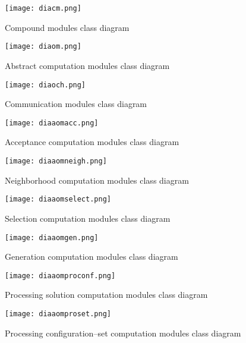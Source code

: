 \begin{figure}
	\centering
	\texttt{[image: diacm.png]}
	\caption[]{Compound modules class diagram}\label{diag:cm}
\end{figure}

\begin{figure}
	\centering
	\texttt{[image: diaom.png]}
	\caption[]{Abstract computation modules class diagram}\label{diag:om}
\end{figure}

\begin{figure}
	\centering
	\texttt{[image: diaoch.png]}
	\caption[]{Communication modules class diagram}\label{diag:opch}
\end{figure}

\begin{figure}
	\centering
	\texttt{[image: diaaomacc.png]}
	\caption[]{Acceptance computation modules class diagram}\label{diag:accmodules}
\end{figure}

\begin{figure}
	\centering
	\texttt{[image: diaaomneigh.png]}
	\caption[]{Neighborhood computation modules class diagram}\label{diag:neighmodules}
\end{figure}

\begin{figure}
	\centering
	\texttt{[image: diaaomselect.png]}
	\caption[]{Selection computation modules class diagram}\label{diag:selectmodules}
\end{figure}

\begin{figure}
	\centering
	\texttt{[image: diaaomgen.png]}
	\caption[]{Generation computation modules class diagram}\label{diag:genmodules}
\end{figure}

\begin{figure}
	\centering
	\texttt{[image: diaaomproconf.png]}
	\caption[]{Processing solution computation modules class diagram}\label{diag:procconfmodules}
\end{figure}

\begin{figure}
	\centering
	\texttt{[image: diaaomproset.png]}
	\caption[]{Processing configuration--set computation modules class diagram}\label{diag:procsetmodules}
\end{figure}

